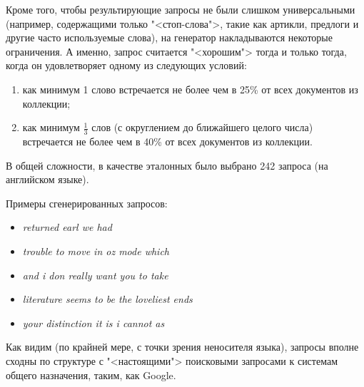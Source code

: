 Кроме того, чтобы результирующие запросы не были слишком универсальными (например, содержащими только "<стоп-слова">, такие как
артикли, предлоги и другие часто используемые слова), на генератор накладываются некоторые ограничения. А именно, запрос считается
"<хорошим"> тогда и только тогда, когда он удовлетворяет одному из следующих условий:

\begin{enumerate}[1)]
    \item как минимум 1 слово встречается не более чем в 25\% от всех документов из коллекции;
    \item как минимум \(\frac{1}{3}\) слов (с округлением до ближайшего целого числа) встречается
    не более чем в 40\% от всех документов из коллекции.
\end{enumerate}

В общей сложности, в качестве эталонных было выбрано 242 запроса (на английском языке).

Примеры сгенерированных запросов:
\begin{itemize}
    \item \textit{returned earl   we had }
    \item \textit{trouble to move in oz mode which}
    \item \textit{and i don really want you to take}
    \item \textit{literature seems to be the loveliest ends }
    \item \textit{your distinction  it is i cannot as}
\end{itemize}

Как видим (по крайней мере, с точки зрения неносителя языка), запросы вполне сходны по структуре с "<настоящими"> поисковыми
запросами к системам общего назначения, таким, как Google.

